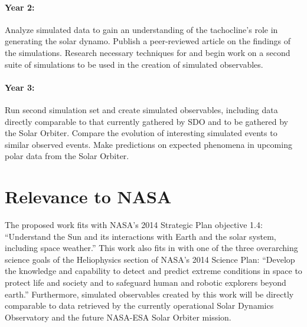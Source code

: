 \documentclass[aasms,12pt]{article}
\begin{document}
\paragraph{Year 2:}
Analyze simulated data to gain an understanding of the tachocline's role in
generating the solar dynamo.  Publish a peer-reviewed article on the findings
of the simulations.  Research necessary techniques for and begin work on 
a second suite of simulations to be
used in the creation of simulated observables.  
\vspace{-0.5cm}
\paragraph{Year 3:}
Run second simulation set and create simulated observables, including data
directly comparable to that currently gathered by SDO and to be gathered by the
Solar Orbiter.  Compare the evolution of interesting simulated
events to similar observed events.  Make predictions on expected phenomena in
upcoming polar data from the Solar Orbiter.


\newpage

\section{Relevance to NASA} 
The proposed work fits with NASA's 2014 Strategic Plan objective
1.4:
``Understand the Sun and its interactions with Earth and the solar
system, including space weather.''
This work also fits in with one of the three overarching science goals
of the Heliophysics section of NASA's 2014 Science Plan: 
``Develop the
knowledge and capability to detect and predict extreme conditions in space to
protect life and society and to safeguard human and robotic explorers beyond
earth.''  Furthermore, simulated observables created by this work will be
directly comparable to data retrieved by the currently operational Solar
Dynamics Observatory and the future NASA-ESA Solar Orbiter mission.
\end{document}
